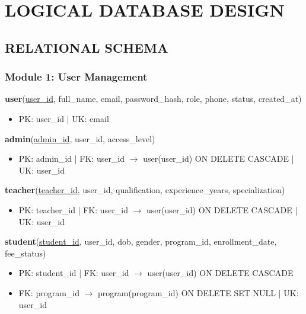\documentclass[12pt,a4paper]{report}
\begin{document}
\chapter{LOGICAL DATABASE DESIGN}

\section{RELATIONAL SCHEMA}

\subsection{Module 1: User Management}

\textbf{user}(\underline{user\_id}, full\_name, email, password\_hash, role, phone, status, created\_at)
\begin{itemize}[noitemsep,topsep=2pt]
    \item PK: user\_id \quad | \quad UK: email
\end{itemize}

\textbf{admin}(\underline{admin\_id}, user\_id, access\_level)
\begin{itemize}[noitemsep,topsep=2pt]
    \item PK: admin\_id \quad | \quad FK: user\_id $\rightarrow$ user(user\_id) ON DELETE CASCADE \quad | \quad UK: user\_id
\end{itemize}

\textbf{teacher}(\underline{teacher\_id}, user\_id, qualification, experience\_years, specialization)
\begin{itemize}[noitemsep,topsep=2pt]
    \item PK: teacher\_id \quad | \quad FK: user\_id $\rightarrow$ user(user\_id) ON DELETE CASCADE \quad | \quad UK: user\_id
\end{itemize}

\textbf{student}(\underline{student\_id}, user\_id, dob, gender, program\_id, enrollment\_date, fee\_status)
\begin{itemize}[noitemsep,topsep=2pt]
    \item PK: student\_id \quad | \quad FK: user\_id $\rightarrow$ user(user\_id) ON DELETE CASCADE
    \item FK: program\_id $\rightarrow$ program(program\_id) ON DELETE SET NULL \quad | \quad UK: user\_id
\end{itemize}
\end{document}
